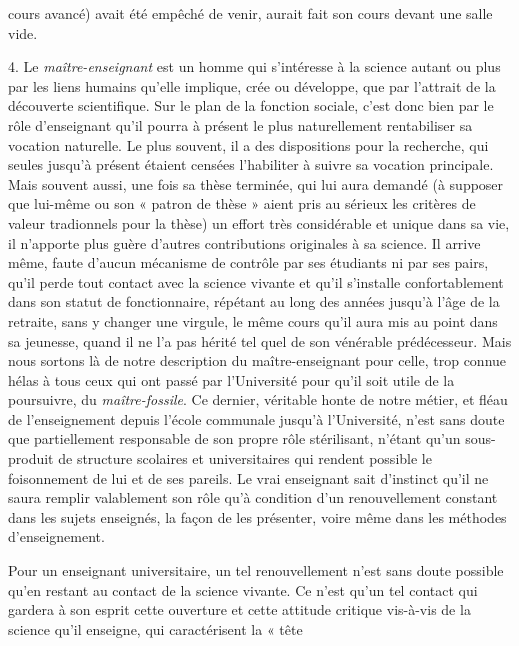 \documentclass[11pt,a4paper]{article}
\begin{document}
cours avancé) avait été empêché de venir, aurait fait son cours devant une
salle vide.

4. Le \emph{maître-enseignant} est un homme qui s'intéresse à la science autant ou
plus par les liens humains qu'elle implique, crée ou développe, que par
l'attrait de la découverte scientifique. Sur le plan de la fonction sociale,
c'est donc bien par le rôle d'enseignant qu'il pourra à présent le plus
naturellement rentabiliser sa vocation naturelle. Le plus souvent, il a des
dispositions pour la recherche, qui seules jusqu'à présent étaient censées
l'habiliter à suivre sa vocation principale. Mais souvent aussi, une fois sa
thèse terminée, qui lui aura demandé (à supposer que lui-même ou son
« patron de thèse » aient pris au sérieux les critères de valeur tradionnels
pour la thèse) un effort très considérable et unique dans sa vie, il
n'apporte plus guère d'autres contributions originales à sa science. Il arrive
même, faute d'aucun mécanisme de contrôle par ses étudiants ni par ses pairs,
qu'il perde tout contact avec la science vivante et qu'il s'installe
confortablement dans son statut de fonctionnaire, répétant au long des années
jusqu'à l'âge de la retraite, sans y changer une virgule, le même cours qu'il
aura mis au point dans sa jeunesse, quand il ne l'a pas hérité tel quel
de son vénérable prédécesseur. Mais nous sortons là de notre description du
maître-enseignant pour celle, trop connue hélas à tous ceux qui ont passé
par l'Université pour qu'il soit utile de la poursuivre, du \emph{maître-fossile}.
Ce dernier, véritable honte de notre métier, et fléau de l'enseignement depuis
l'école communale jusqu'à l'Université, n'est sans doute que partiellement
responsable de son propre rôle stérilisant, n'étant qu'un sous-produit de
structure scolaires et universitaires qui rendent possible le foisonnement de
lui et de ses pareils. Le vrai enseignant sait d'instinct qu'il ne saura
remplir valablement son rôle qu'à condition d'un renouvellement constant dans
les sujets enseignés, la façon de les présenter, voire même dans les méthodes
d'enseignement.

Pour un enseignant universitaire, un tel renouvellement n'est sans
doute possible qu'en restant au contact de la science vivante. Ce n'est qu'un
tel contact qui gardera à son esprit cette ouverture et cette attitude
critique vis-à-vis de la science qu'il enseigne, qui caractérisent la « tête
\end{document}
